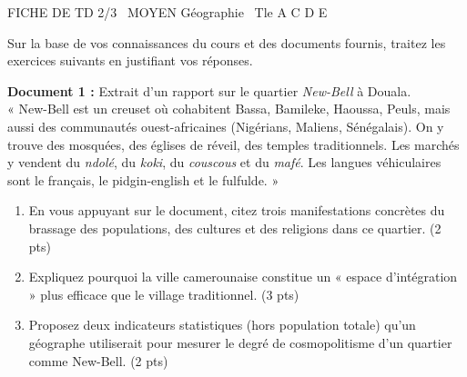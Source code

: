 \documentclass[11pt]{article}
\begin{document}
\begin{tcolorbox}[enhanced,colback=popink,colframe=popink,arc=10pt,boxrule=0pt,left=12pt,right=12pt,top=9pt,bottom=9pt]
{\color{white}\popxbold\small FICHE DE TD 2/3 \textbullet\ MOYEN \hfill Géographie \textbullet\ Tle A C D E\par}
\end{tcolorbox}
\vspace{4pt}
\noindent Sur la base de vos connaissances du cours et des documents fournis, traitez les exercices suivants en justifiant vos réponses.

\begin{exercice}
\textbf{Document 1 :} Extrait d'un rapport sur le quartier \textit{New-Bell} à Douala. \\
« New-Bell est un creuset où cohabitent Bassa, Bamileke, Haoussa, Peuls, mais aussi des communautés ouest-africaines (Nigérians, Maliens, Sénégalais). On y trouve des mosquées, des églises de réveil, des temples traditionnels. Les marchés y vendent du \textit{ndolé}, du \textit{koki}, du \textit{couscous} et du \textit{mafé}. Les langues véhiculaires sont le français, le pidgin-english et le fulfulde. »
\begin{enumerate}
    \item En vous appuyant sur le document, citez trois manifestations concrètes du brassage des populations, des cultures et des religions dans ce quartier. (2 pts)
    \item Expliquez pourquoi la ville camerounaise constitue un « espace d’intégration » plus efficace que le village traditionnel. (3 pts)
    \item Proposez deux indicateurs statistiques (hors population totale) qu'un géographe utiliserait pour mesurer le degré de cosmopolitisme d'un quartier comme New-Bell. (2 pts)
\end{enumerate}
\end{exercice}
\end{document}
